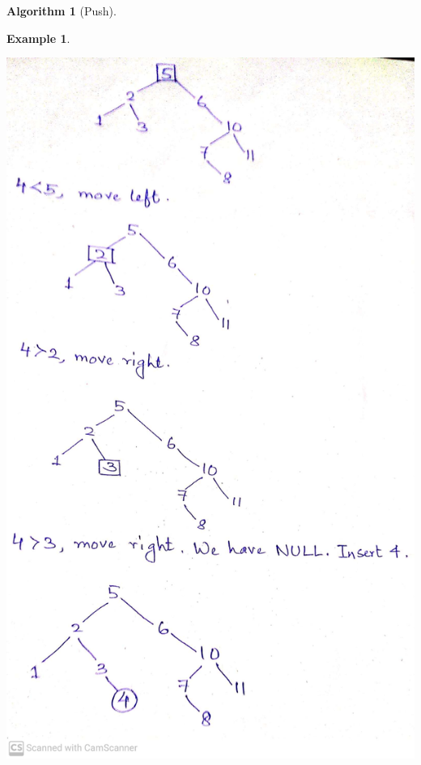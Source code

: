 \documentclass[10pt, a4paper]{extarticle}
\theoremstyle{definition}
\newtheorem{alg}{Algorithm}
\newtheorem{eg}{Example}
\begin{document}
\begin{alg}[Push]
\begin{eg}
\begin{center}
			\includegraphics[scale=0.16]{bst3.jpg}\\
		\end{center}
	\end{eg}


\end{alg}
\end{document}
